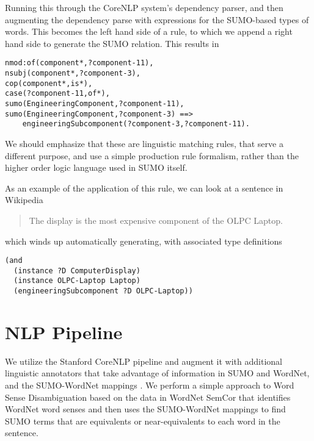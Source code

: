 \documentclass{book}
\begin{document}
Running this through the CoreNLP system's dependency parser, and then augmenting
the dependency parse with expressions for the SUMO-based types of words. This
becomes the left hand side of a rule, to which we append a right hand side to
generate the SUMO relation.  This results in

\begin{lstlisting}[basicstyle=\ttfamily\small\bfseries]
nmod:of(component*,?component-11), 
nsubj(component*,?component-3), 
cop(component*,is*), 
case(?component-11,of*), 
sumo(EngineeringComponent,?component-11), 
sumo(EngineeringComponent,?component-3) ==>
    engineeringSubcomponent(?component-3,?component-11).
\end{lstlisting}

We should emphasize that these are linguistic matching rules, that serve a
different purpose, and use a simple production rule formalism, rather than the
higher order logic language used in SUMO itself.

As an example of the application of this rule, we can look at a sentence in Wikipedia

\begin{itshape}
\begin{quotation}
The display is the most expensive component of the OLPC Laptop.
\end{quotation}
\end{itshape}

which winds up automatically generating, with associated type definitions

\begin{lstlisting}[basicstyle=\ttfamily\small\bfseries]
(and
  (instance ?D ComputerDisplay)
  (instance OLPC-Laptop Laptop)
  (engineeringSubcomponent ?D OLPC-Laptop)) 
\end{lstlisting}


\section{NLP Pipeline}

We utilize the Stanford CoreNLP \cite{manning-EtAl:2014:P14-5} pipeline and
augment it with additional linguistic annotators that take advantage of
information in SUMO and WordNet, and the SUMO-WordNet mappings \cite{np03}. We
perform a simple approach to Word Sense Disambiguation based on the data in
WordNet SemCor \cite{LandesLeacock} that identifies WordNet word senses and then
uses the SUMO-WordNet mappings to find SUMO terms that are equivalents or
near-equivalents to each word in the sentence.
\end{document}
